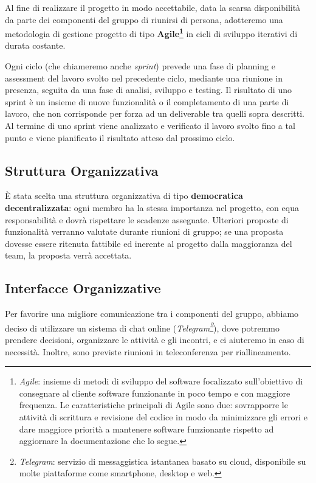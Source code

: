 \documentclass{article}
\begin{document}
Al fine di realizzare il progetto in modo accettabile, data la scarsa disponibilità da parte dei componenti del gruppo di riunirsi di persona, adotteremo una metodologia di gestione progetto di tipo \textbf{Agile\footnote{\emph{Agile}:
insieme di metodi di sviluppo del software focalizzato sull'obiettivo di consegnare al cliente software funzionante in poco tempo e con maggiore frequenza. Le caratteristiche principali di Agile sono due: sovrapporre le attività di scrittura e revisione del codice in modo da minimizzare gli
errori e dare maggiore priorità a mantenere software funzionante rispetto ad aggiornare la documentazione che lo segue.}}
in cicli di sviluppo iterativi di durata costante.

Ogni ciclo (che chiameremo anche \emph{sprint}) prevede una fase di planning e assessment del lavoro svolto nel precedente ciclo, mediante una riunione in presenza, seguita da una fase di analisi, sviluppo e testing. Il risultato di uno sprint è un insieme di nuove funzionalità o il completamento di una parte di lavoro, che non corrisponde per forza ad un deliverable tra quelli sopra descritti. Al termine di uno sprint viene analizzato e verificato il lavoro svolto fino a tal punto e viene pianificato il risultato atteso dal prossimo ciclo.

\subsection{Struttura Organizzativa}

È stata scelta una struttura organizzativa di tipo \textbf{democratica decentralizzata}: ogni membro ha la stessa importanza nel progetto, con equa responsabilità e dovrà rispettare le scadenze assegnate. Ulteriori proposte di funzionalità verranno valutate durante riunioni di gruppo; se una proposta dovesse essere ritenuta fattibile ed inerente al progetto dalla maggioranza del team, la proposta verrà accettata.

\subsection{Interfacce Organizzative}

Per favorire una migliore comunicazione tra i componenti del gruppo, abbiamo deciso di utilizzare un sistema di chat online (\emph{Telegram\footnote{\emph{Telegram}: servizio di messaggistica istantanea basato su cloud, disponibile su molte piattaforme come smartphone, desktop e web.}}), dove potremmo prendere decisioni, organizzare le attività e gli incontri, e ci aiuteremo in caso di necessità. Inoltre, sono previste riunioni in teleconferenza per riallineamento.
\end{document}
